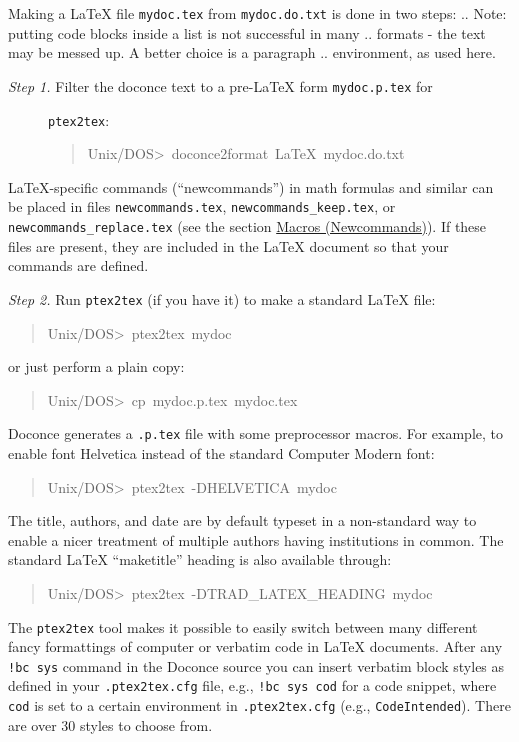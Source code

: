 \documentclass[a4paper,english]{article}
\begin{document}
Making a LaTeX file \texttt{mydoc.tex} from \texttt{mydoc.do.txt} is done in two steps:
.. Note: putting code blocks inside a list is not successful in many
.. formats - the text may be messed up. A better choice is a paragraph
.. environment, as used here.
%
\begin{description}
\item[{\emph{Step 1.} Filter the doconce text to a pre-LaTeX form \texttt{mydoc.p.tex} for}] \leavevmode 
\texttt{ptex2tex}:
%
\begin{quote}{\ttfamily \raggedright \noindent
Unix/DOS>~doconce2format~LaTeX~mydoc.do.txt
}
\end{quote}

\end{description}

LaTeX-specific commands (``newcommands'') in math formulas and similar
can be placed in files \texttt{newcommands.tex}, \texttt{newcommands\_keep.tex}, or
\texttt{newcommands\_replace.tex} (see the section \hyperref[macros-newcommands]{Macros (Newcommands)}).
If these files are present, they are included in the LaTeX document
so that your commands are defined.

\emph{Step 2.} Run \texttt{ptex2tex} (if you have it) to make a standard LaTeX file:
%
\begin{quote}{\ttfamily \raggedright \noindent
Unix/DOS>~ptex2tex~mydoc
}
\end{quote}

or just perform a plain copy:
%
\begin{quote}{\ttfamily \raggedright \noindent
Unix/DOS>~cp~mydoc.p.tex~mydoc.tex
}
\end{quote}

Doconce generates a \texttt{.p.tex} file with some preprocessor macros.
For example, to enable font Helvetica instead of the standard
Computer Modern font:
%
\begin{quote}{\ttfamily \raggedright \noindent
Unix/DOS>~ptex2tex~-DHELVETICA~mydoc
}
\end{quote}

The title, authors, and date are by default typeset in a non-standard
way to enable a nicer treatment of multiple authors having
institutions in common. The standard LaTeX ``maketitle'' heading
is also available through:
%
\begin{quote}{\ttfamily \raggedright \noindent
Unix/DOS>~ptex2tex~-DTRAD\_LATEX\_HEADING~mydoc
}
\end{quote}

The \texttt{ptex2tex} tool makes it possible to easily switch between many
different fancy formattings of computer or verbatim code in LaTeX
documents. After any \texttt{!bc sys} command in the Doconce source you can
insert verbatim block styles as defined in your \texttt{.ptex2tex.cfg}
file, e.g., \texttt{!bc sys cod} for a code snippet, where \texttt{cod} is set to
a certain environment in \texttt{.ptex2tex.cfg} (e.g., \texttt{CodeIntended}).
There are over 30 styles to choose from.
\end{document}
